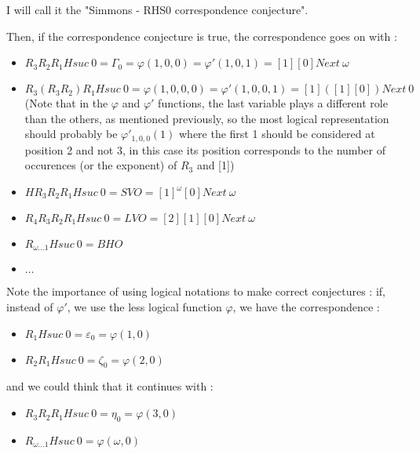 \documentclass[10pt]{article}
\begin{document}
I will call it the "Simmons - RHS0 correspondence conjecture".



\bigskip

Then, if the correspondence conjecture is true, the correspondence goes on with : 

\begin{itemize}
     \setlength{\itemsep}{1pt}
     \setlength{\parskip}{0pt}
     \setlength{\parsep}{0pt}
\item \( R_3 R_2 R_1 H suc\ 0 = \Gamma_0 = \varphi(1,0,0) = \varphi'(1,0,1) = [1] [0] Next\ \omega \)
\item \( R_3 (R_3 R_2) R_1 H suc\ 0 = \varphi(1,0,0,0) = \varphi'(1,0,0,1) = [1] ([1] [0]) Next\ 0 \) (Note that in the \( \varphi \) and \( \varphi' \) functions, the last variable plays a different role than the others, as mentioned previously, so the most logical representation should probably be \( \varphi'_{1,0,0}(1) \) where the first 1 should be considered at position 2 and not 3, in this case its position corresponds to the number of occurences (or the exponent) of \( R_3 \) and [1])
\item \( H R_3 R_2 R_1 H suc\ 0 = SVO = [1]^\omega [0] Next\ \omega \)
\item \( R_4 R_3 R_2 R_1 H suc\ 0 = LVO = [2] [1] [0] Next\ \omega \)
\item \( R_{\omega \ldots 1} H suc\ 0 = BHO \)
\item \( \ldots \)
\end{itemize}

Note the importance of using logical notations to make correct conjectures : if, instead of \( \varphi' \), we use the less logical function \( \varphi \), we have the correspondence :

\begin{itemize}
     \setlength{\itemsep}{1pt}
     \setlength{\parskip}{0pt}
     \setlength{\parsep}{0pt}
\item \( R_1 H suc\ 0 = \varepsilon_0 = \varphi(1,0) \)
\item \( R_2 R_1 H suc\ 0 = \zeta_0 = \varphi(2,0) \)
\end{itemize}

and we could think that it continues with :

\begin{itemize}
     \setlength{\itemsep}{1pt}
     \setlength{\parskip}{0pt}
     \setlength{\parsep}{0pt}
\item \( R_3 R_2 R_1 H suc\ 0 = \eta_0 = \varphi(3,0) \)
\item \( R_{\omega \ldots 1} H suc\ 0 = \varphi(\omega,0) \)
\end{itemize}
\end{document}

